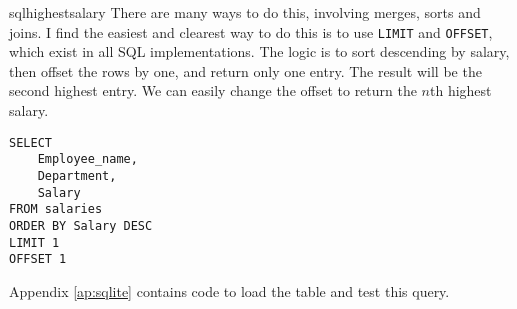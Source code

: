 \begin{subanswer}{sqlhighestsalary}
There are many ways to do this, involving merges, sorts and joins.
I find the easiest and clearest way to do this is to use \verb+LIMIT+ and \verb+OFFSET+, which exist in all SQL implementations.
The logic is to sort descending by salary, then offset the rows by one, and return only one entry.
The result will be the second highest entry.
We can easily change the offset to return the $n$th highest salary.
\begin{verbatim}
SELECT
    Employee_name,
    Department,
    Salary
FROM salaries
ORDER BY Salary DESC
LIMIT 1
OFFSET 1
\end{verbatim}
Appendix \ref{ap:sqlite} contains code to load the table and test this query.
\end{subanswer}
